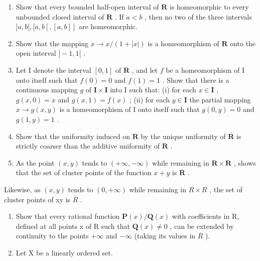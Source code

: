 \begin{enumerate}
\def\labelenumi{\arabic{enumi})}
\item
  Show that every bounded half-open interval of \(\mathbf{R}\) is homeomorphic to every unbounded closed interval of \(\mathbf{R}\) . If \(a < b\) , then no two of the three intervals \(]a, b[, [a, b[, [a, b]]\) are homeomorphic.
\item
  Show that the mapping \(x \to x / (1 + |x|)\) is a homeomorphism of \(\mathbf{R}\) onto the open interval \(] - 1, 1[\) .
\item
  Let I denote the interval \([0, 1]\) of \(\mathbf{R}\) , and let \(f\) be a homeomorphism of I onto itself such that \(f(0) = 0\) and \(f(1) = 1\) . Show that there is a continuous mapping \(g\) of \(\mathbf{I} \times \mathbf{I}\) into I such that: (i) for each \(x \in \mathbf{I}\) , \(g(x, 0) = x\) and \(g(x, 1) = f(x)\) ; (ii) for each \(y \in \mathbf{I}\) the partial mapping \(x \to g(x, y)\) is a homeomorphism of I onto itself such that \(g(0, y) = 0\) and \(g(1, y) = 1\) .
\item
  Show that the uniformity induced on \(\mathbf{R}\) by the unique uniformity of \(\overline{\mathbf{R}}\) is strictly coarser than the additive uniformity of \(\mathbf{R}\) .
\item
  As the point \((x, y)\) tends to \((+\infty, -\infty)\) while remaining in \(\mathbf{R} \times \mathbf{R}\) , shows that the set of cluster points of the function \(x + y\) is \(\overline{\mathbf{R}}\) .
\end{enumerate}

Likewise, as \((x,y)\) tends to \((0,+\infty)\) while remaining in \(R\times R\) , the set of cluster points of xy is \(\overline{R}\) .

\begin{enumerate}
\def\labelenumi{\arabic{enumi})}
\setcounter{enumi}{5}
\item
  Show that every rational function \(\mathbf{P}(x)/\mathbf{Q}(x)\) with coefficients in R, defined at all points x of R such that \(\mathbf{Q}(x)\neq0\) , can be extended by continuity to the points \(+\infty\) and \(-\infty\) (taking its values in \(\overline{R}\) ).
\item
  Let X be a linearly ordered set.
\end{enumerate}


